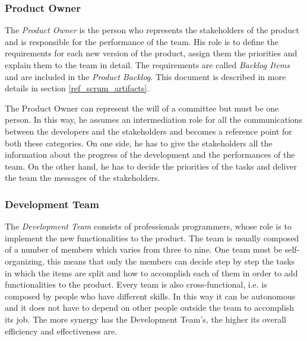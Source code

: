 			\subsubsection{Product Owner}\label{ref_prod_owner}
			The \emph{Product Owner} is the person who represents the stakeholders of the product and is responsible for the performance of the team. His role is to define the requirements for each new version of the product, assign them the priorities and explain them to the team in detail. 
			The requirements are called \emph{Backlog Items} and are included in the \emph{Product Backlog}. This document is described in more details in section \ref{ref_scrum_artifacts}.
			
			The Product Owner can represent the will of a committee but must be one person. 
			In this way, he assumes an intermediation role for all the communications between the developers and the stakeholders and becomes a reference point for both these categories. 
			On one side, he has to give the stakeholders all the information about the progress of the development and the performances of the team. On the other hand, he has to decide the priorities of the tasks and deliver the team the messages of the stakeholders.
			

			\subsubsection{Development Team}\label{ref_scrum_dev_team}
			The \emph{Development Team} consists of professionals programmers, whose role is to implement the new functionalities to the product. The team is usually composed of a number of members which varies from three to nine. 	
			One team must be self-organizing, this means that only the members can decide step by step the tasks in which the items are split and how to accomplish each of them in order to add functionalities to the product. 
			Every team is also cross-functional, i.e. is composed by people who have different skills. In this way it can be autonomous and it does not have to depend on other people outside the team to accomplish its job.
			The more synergy has the Development Team's, the higher its overall efficiency and effectiveness are.
 

